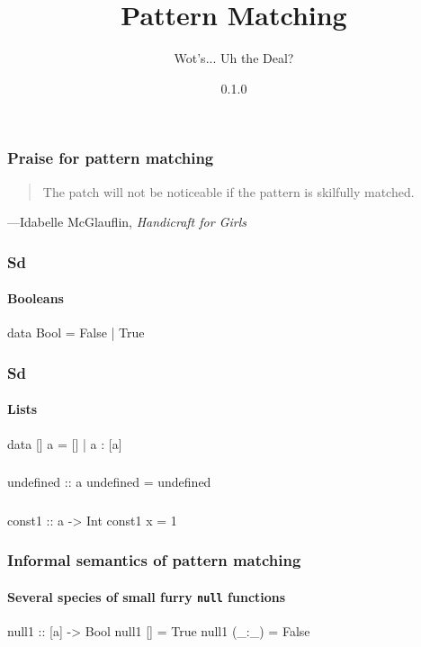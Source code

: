 \documentclass{beamer}
\title{Pattern Matching}
\subtitle{Wot's... Uh the Deal?}
\author{}
\institute{Stack Builders}
\date{0.1.0}
\begin{document}

\frame{\titlepage}


\begin{frame}
  \frametitle{Praise for pattern matching}

  \begin{quote}
    The patch will not be noticeable if the pattern is skilfully
    matched.
  \end{quote}
  \hfill---Idabelle McGlauflin, \emph{Handicraft for Girls}
\end{frame}


\begin{frame}[fragile]
  \frametitle{Sd}
  \framesubtitle{Booleans}

  \begin{code}
data Bool = False | True
  \end{code}
\end{frame}

\begin{frame}[fragile]
  \frametitle{Sd}
  \framesubtitle{Lists}

  \begin{code}
data [] a = [] | a : [a]
  \end{code}
\end{frame}

\begin{frame}[fragile]
  \frametitle{}

  \begin{code}
undefined :: a
undefined = undefined
  \end{code}
\end{frame}

\begin{frame}[fragile]
  \frametitle{}

  \begin{code}
const1 :: a -> Int
const1 x = 1
  \end{code}
\end{frame}


\begin{frame}[fragile]
  \frametitle{Informal semantics of pattern matching}
  \framesubtitle{Several species of small furry \texttt{null} functions}

  \begin{code}
null1 :: [a] -> Bool
null1 []    = True
null1 (_:_) = False
  \end{code}
\end{frame}
\end{document}
